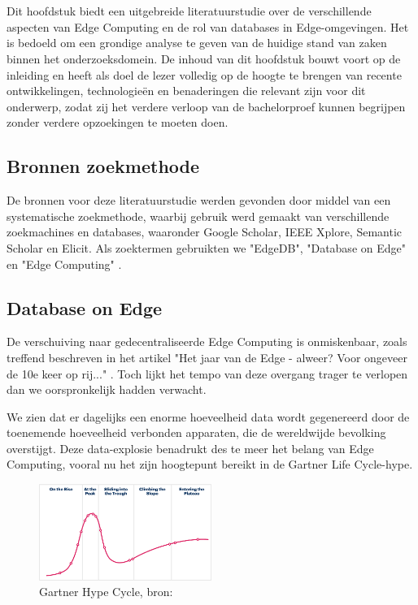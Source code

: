 \chapter{}%
\label{ch:stand-van-zaken}

Dit hoofdstuk biedt een uitgebreide literatuurstudie over de verschillende aspecten van Edge Computing en de rol van databases in Edge-omgevingen.
Het is bedoeld om een grondige analyse te geven van de huidige stand van zaken binnen het onderzoeksdomein.
De inhoud van dit hoofdstuk bouwt voort op de inleiding en heeft als doel de lezer volledig op de hoogte te brengen van recente ontwikkelingen, technologieën en benaderingen die relevant zijn voor dit onderwerp, zodat zij het verdere verloop van de bachelorproef kunnen begrijpen zonder verdere opzoekingen te moeten doen.

\section{Bronnen zoekmethode}
De bronnen voor deze literatuurstudie werden gevonden door middel van een systematische zoekmethode, waarbij gebruik werd gemaakt van verschillende zoekmachines en databases, waaronder Google Scholar, IEEE Xplore, Semantic Scholar en Elicit.
Als zoektermen gebruikten we "EdgeDB", "Database on Edge" en "Edge Computing" \autocite{Yang2019EdgeDBAE, Paparrizos2021VergeDBAD, Gyorodi2015comparative}.

\section{Database on Edge}
De verschuiving naar gedecentraliseerde Edge Computing is onmiskenbaar, zoals treffend beschreven in het artikel "Het jaar van de Edge - alweer? Voor ongeveer de 10e keer op rij..." \autocite{Dollinger2022}. Toch lijkt het tempo van deze overgang trager te verlopen dan we oorspronkelijk hadden verwacht.

We zien dat er dagelijks een enorme hoeveelheid data wordt gegenereerd door de toenemende hoeveelheid verbonden apparaten, die de wereldwijde bevolking overstijgt. Deze data-explosie benadrukt des te meer het belang van Edge Computing, vooral nu het zijn hoogtepunt bereikt in de Gartner Life Cycle-hype.

\begin{figure}[h]
    \centering
    \includegraphics[width=0.5\textwidth]{hype-cycle-illustation.png}
    \caption{Gartner Hype Cycle, bron: \autocite{Gartner2023}}
    \label{fig:hype-cycle}
\end{figure}

